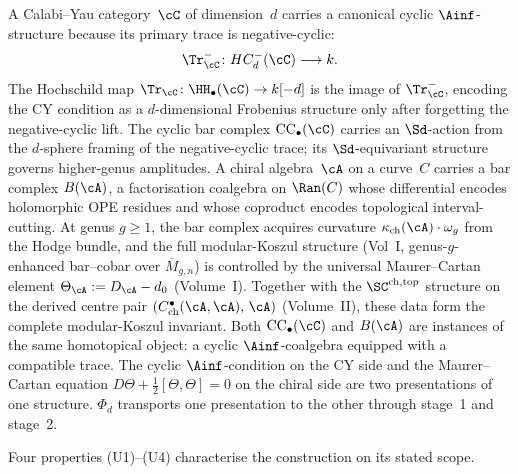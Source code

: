 A Calabi--Yau category~$\cC$ of dimension~$d$ carries a
canonical cyclic $\Ainf$-structure because its primary trace is
negative-cyclic:
\[
 \Tr^-_\cC \colon HC^-_d(\cC)\longrightarrow k.
\]
The Hochschild map
\(\Tr_\cC\colon \HH_\bullet(\cC)\to k[-d]\) is the image of
\(\Tr^-_\cC\), encoding the CY condition as a $d$-dimensional
Frobenius structure only after forgetting the negative-cyclic lift. The
cyclic bar complex $\mathrm{CC}_\bullet(\cC)$ carries an $\Sd$-action
from the $d$-sphere framing of the negative-cyclic trace; its
$\Sd$-equivariant structure governs higher-genus amplitudes. A chiral algebra~$\cA$
on a curve~$C$ carries a bar complex $B(\cA)$, a factorisation
coalgebra on $\Ran(C)$ whose differential encodes holomorphic OPE
residues and whose coproduct encodes topological interval-cutting.
At genus $g \geq 1$, the bar complex acquires curvature
$\kappa_{\mathrm{ch}}(\cA) \cdot \omega_g$ from the Hodge bundle,
and the full modular-Koszul structure (Vol~I, genus-$g$-enhanced
bar--cobar over $\overline{M}_{g,n}$) is controlled by the
universal Maurer--Cartan element $\Theta_\cA := D_\cA - d_0$
(Volume~I). Together with the $\SC^{\mathrm{ch,top}}$ structure
on the derived centre pair $(C^\bullet_{\mathrm{ch}}(\cA, \cA),\,
\cA)$ (Volume~II), these data form the complete modular-Koszul
invariant. Both $\mathrm{CC}_\bullet(\cC)$ and $B(\cA)$ are
instances of the same homotopical object: a cyclic
$\Ainf$-coalgebra equipped with a compatible trace. The cyclic
$\Ainf$-condition on the CY side and the Maurer--Cartan equation
$D\Theta + \tfrac{1}{2}[\Theta, \Theta] = 0$ on the chiral side
are two presentations of one structure. $\Phi_d$ transports one
presentation to the other through stage~1 and stage~2.

Four properties (U1)--(U4) characterise the construction on its stated
scope.

